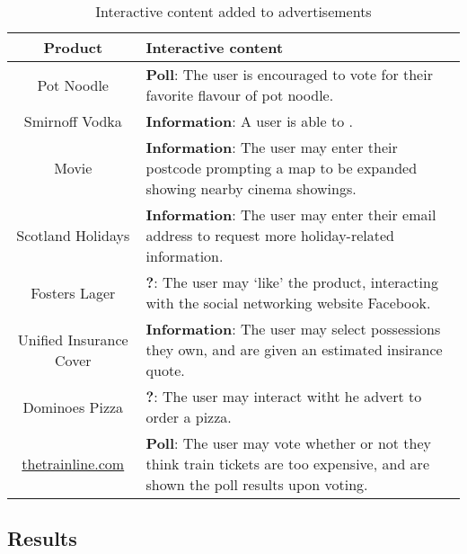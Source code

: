 	\begin{table}[hb]
		\centering
		\begin{tabularx}{\linewidth}{ c X }
			\toprule
			\bf Product & \bf Interactive content \\
			\midrule
			Pot Noodle & \textbf{Poll}: The user is encouraged to vote for their favorite flavour of pot noodle. \\
			Smirnoff Vodka & \textbf{Information}: A user is able to . \\ %
			Movie & \textbf{Information}: The user may enter their postcode prompting a map to be expanded showing nearby cinema showings. \\
			Scotland Holidays & \textbf{Information}: The user may enter their email address to request more holiday-related information. \\
			Fosters Lager & \textbf{?}: The user may `like' the product, interacting with the social networking website Facebook. \\
			Unified Insurance Cover & \textbf{Information}: The user may select possessions they own, and are given an estimated insirance quote. \\
			Dominoes Pizza & \textbf{?}: The user may interact witht he advert to order a pizza. \\
			\url{thetrainline.com} & \textbf{Poll}: The user may vote whether or not they think train tickets are too expensive, and are shown the poll results upon voting. \\
			\bottomrule
		\end{tabularx}
		\caption{Interactive content added to advertisements}
		\label{tab:interactive_content}
	\end{table}

	

	\subsection{Results}
